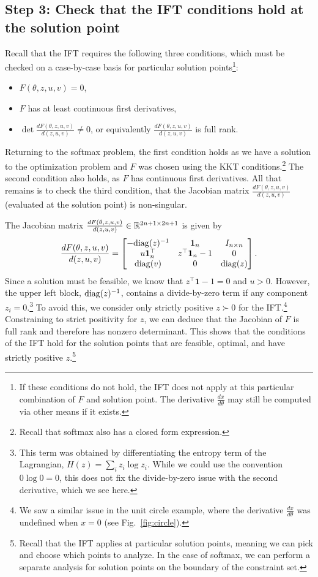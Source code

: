 \documentclass[11pt]{article}
\begin{document}
\subsection*{Step 3: Check that the IFT conditions hold at the solution point}
Recall that the IFT requires the following three conditions,
which must be checked on a case-by-case basis for particular
solution points\footnote{If these conditions do not hold,
the IFT does not apply at this particular combination of $F$ and solution point.
The derivative $\frac{dx}{d\theta}$ may still be computed via other means
if it exists.}:
\begin{itemize}
    \item $F(\theta,z,u,v) = 0$,
    \item $F$ has at least continuous first derivatives,
    \item $\det\frac{dF(\theta,z,u,v)}{d(z,u,v)} \ne 0$,
        or equivalently $\frac{dF(\theta,z,u,v)}{d(z,u,v)}$
        is full rank.
\end{itemize}
Returning to the softmax problem,
the first condition holds as we have a solution to the optimization problem
and $F$ was chosen using the KKT conditions.\footnote{
Recall that softmax also has a closed form expression.}
The second condition also holds, as $F$ has continuous first derivatives.
All that remains is to check the third condition,
that the Jacobian matrix $\frac{dF(\theta,z,u,v)}{d(z,u,v)}$
(evaluated at the solution point) is non-singular.

The Jacobian matrix $\frac{dF(\theta,z,u,v)}{d(z,u,v)}\in\mathbb{R}^{2n+1\times 2n+1}$ is given by
\begin{equation}
\label{eqn:f-jac}
\frac{dF(\theta,z,u,v)}{d(z,u,v)}=
\begin{bmatrix}
-\mathrm{diag}(z)^{-1} & \mathbf{1}_n & I_{n\times n} \\
u\mathbf{1}_n^\top & z^\top\mathbf{1}_n - 1 & 0\\
\mathrm{diag}(v) & 0 & \mathrm{diag}(z)
\end{bmatrix}.
\end{equation}
Since a solution must be feasible, we know that $z^\top\mathbf{1}-1=0$ and $u > 0$.
However, the upper left block, $\mathrm{diag}(z)^{-1}$, contains a divide-by-zero term if
any component $z_i = 0$.\footnote{
This term was obtained by differentiating the entropy
term of the Lagrangian, $H(z) = \sum_i z_i\log z_i$.
While we could use the convention $0\log 0 = 0$,
this does not fix the divide-by-zero issue with the second derivative, which we see here.
}
To avoid this, we consider only strictly positive $z \succ 0$ for the IFT.\footnote{
We saw a similar issue in the unit circle example, where the derivative
$\frac{dx}{d\theta}$ was undefined when $x=0$ (see Fig.~\ref{fig:circle}).
}
Constraining to strict positivity for $z$,
we can deduce that the Jacobian of $F$ is full rank and therefore has nonzero determinant.
This shows that the conditions of the IFT hold for the solution points that are
feasible, optimal, and have strictly positive $z$.\footnote{
Recall that the IFT applies at particular solution points,
meaning we can pick and choose which points to analyze.
In the case of softmax, we can perform a separate analysis
for solution points on the boundary of the constraint set.
}
\end{document}
